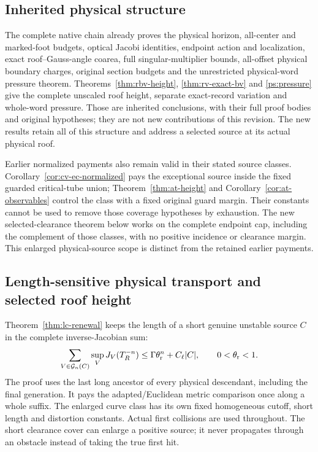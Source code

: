 \subsection*{Inherited physical structure}
The complete native chain already proves the physical horizon,
all-center and marked-foot budgets, optical Jacobi identities,
endpoint action and localization, exact roof--Gauss-angle coarea,
full singular-multiplier bounds, all-offset physical boundary
charges, original section budgets and the unrestricted physical-word
pressure theorem. Theorems~\ref{thm:rbv-height},
\ref{thm:rv-exact-bv} and \ref{ps:pressure} give the complete
unscaled roof height, separate exact-record variation and
whole-word pressure. Those are inherited conclusions, with their
full proof bodies and original hypotheses; they are not new
contributions of this revision. The new results retain all of this
structure and address a selected source at its actual physical roof.

Earlier normalized payments also remain valid in their stated
source classes. Corollary~\ref{cor:cv-ec-normalized} pays the
exceptional source inside the fixed guarded critical-tube union;
Theorem~\ref{thm:at-height} and
Corollary~\ref{cor:at-observables} control the class with a
fixed original guard margin. Their constants cannot be used
to remove those coverage hypotheses by exhaustion. The new
selected-clearance theorem below works on the complete endpoint
cap, including the complement of those classes, with no positive
incidence or clearance margin. This enlarged physical-source
scope is distinct from the retained earlier payments.

\subsection*{Length-sensitive physical transport and selected roof height}
Theorem~\ref{thm:lc-renewal} keeps the length of a short genuine
unstable source $C$ in the complete inverse-Jacobian sum:
\[
 \sum_{V\in\mathcal G_n(C)}\sup_VJ_V(T_R^{-n})
       \le\Gamma\theta_{\rm r}^n+C_\ell|C|,
       \qquad 0<\theta_{\rm r}<1.
\]
The proof uses the last long ancestor of every physical descendant,
including the final generation. It pays the adapted/Euclidean
metric comparison once along a whole suffix. The enlarged curve
class has its own fixed homogeneous cutoff, short length and
distortion constants. Actual first collisions are used throughout.
The short clearance cover can enlarge a positive source; it never
propagates through an obstacle instead of taking the true first hit.

